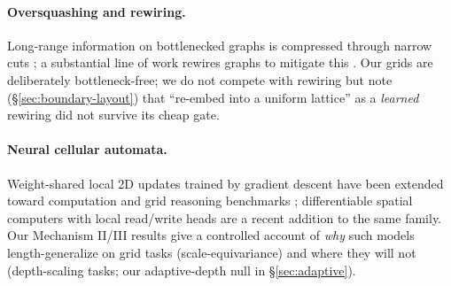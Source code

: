 \documentclass[11pt]{article}
\begin{document}
\paragraph{Oversquashing and rewiring.} Long-range information on
bottlenecked graphs is compressed through narrow cuts
\citep{alon2021bottleneck}; a substantial line of work rewires graphs to
mitigate this \citep{topping2022curvature, black2023effresistance,
digiovanni2023oversquashing, barbero2023laser}. Our grids are deliberately
bottleneck-free; we do not compete with rewiring but note
(\S\ref{sec:boundary-layout}) that ``re-embed into a uniform lattice'' as a
\emph{learned} rewiring did not survive its cheap gate.

\paragraph{Neural cellular automata.} Weight-shared local 2D updates trained
by gradient descent \citep{mordvintsev2020nca} have been extended toward
computation \citep{bena2025path} and grid reasoning benchmarks
\citep{xu2025ncaarc}; differentiable spatial computers with local read/write
heads \citep{malhotra2025nftm} are a recent addition to the same family. Our
Mechanism II/III results give a controlled account of \emph{why} such models
length-generalize on grid tasks (scale-equivariance) and where they will not
(depth-scaling tasks; our adaptive-depth null in \S\ref{sec:adaptive}).
\end{document}
